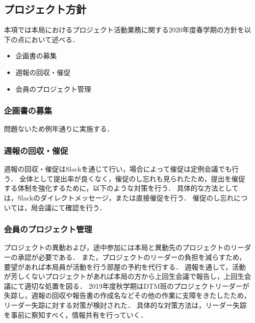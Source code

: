 ﻿\subsection*{プロジェクト方針}


本項では本局におけるプロジェクト活動業務に関する2020年度春学期の方針を以下の点において述べる．

\begin{itemize}
\item 企画書の募集
\item 週報の回収・催促
\item 会員のプロジェクト管理
\end{itemize}

\subsubsection*{企画書の募集}
問題ないため例年通りに実施する．

\subsubsection*{週報の回収・催促}

週報の回収・催促はSlackを通じて行い，場合によって催促は定例会議でも行う．
全体として提出率が良くなく，催促のし忘れも見られたため，提出を催促する体制を強化するために，以下のような対策を行う．
具体的な方法としては，Slackのダイレクトメッセージ，または直接催促を行う．
催促のし忘れについては，局会議にて確認を行う．

\subsubsection*{会員のプロジェクト管理}

プロジェクトの異動および，途中参加には本局と異動先のプロジェクトのリーダーの承認が必要である．
また，プロジェクトのリーダーの負担を減らすため，要望があれば本局員が活動を行う部屋の予約を代行する．
週報を通して，活動が芳しくないプロジェクトがあれば本局の方から上回生会議で報告し，上回生会議にて適切な処置を図る．
2019年度秋学期はDTM班のプロジェクトリーダーが失踪し，週報の回収や報告書の作成名などその他の作業に支障をきたしたため，リーダー失踪に対する対策が検討された．
具体的な対策方法は，リーダー失踪を事前に察知すべく，情報共有を行っていく．
